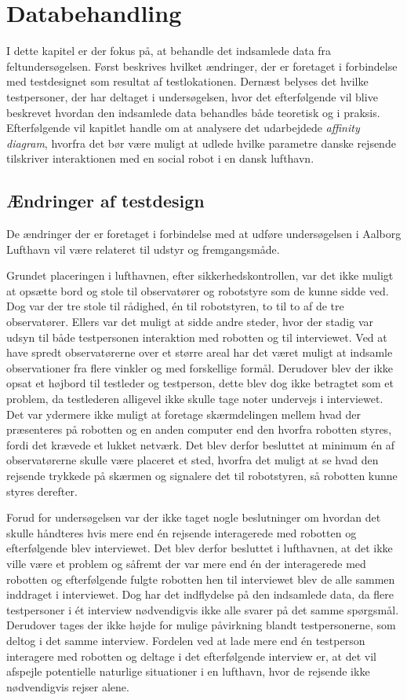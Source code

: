 \chapter{Databehandling}
\label{ParametreDatabehandling}
%
I dette kapitel er der fokus på, at behandle det indsamlede data fra feltundersøgelsen. Først beskrives hvilket ændringer, der er foretaget i forbindelse med testdesignet som resultat af testlokationen. Dernæst belyses det hvilke testpersoner, der har deltaget i undersøgelsen, hvor det efterfølgende vil blive beskrevet hvordan den indsamlede data behandles både teoretisk og i praksis. Efterfølgende vil kapitlet handle om at analysere det udarbejdede \textit{affinity diagram}, hvorfra det bør være muligt at udlede hvilke parametre danske rejsende tilskriver interaktionen med en social robot i en dansk lufthavn. 

\section{Ændringer af testdesign}
\label{ParametreTestdesign}
%
De ændringer der er foretaget i forbindelse med at udføre undersøgelsen i Aalborg Lufthavn vil være relateret til udstyr og fremgangsmåde. 

Grundet placeringen i lufthavnen, efter sikkerhedskontrollen, var det ikke muligt at opsætte bord og stole til observatører og robotstyre som de kunne sidde ved. Dog var der tre stole til rådighed, én til robotstyren, to til to af de tre observatører. Ellers var det muligt at sidde andre steder, hvor der stadig var udsyn til både testpersonen interaktion med robotten og til interviewet. Ved at have spredt observatørerne over et større areal har det været muligt at indsamle observationer fra flere vinkler og med forskellige formål. Derudover blev der ikke opsat et højbord til testleder og testperson, dette blev dog ikke betragtet som et problem, da testlederen alligevel ikke skulle tage noter undervejs i interviewet. Det var ydermere ikke muligt at foretage skærmdelingen mellem hvad der præsenteres på robotten og en anden computer end den hvorfra robotten styres, fordi det krævede et lukket netværk. Det blev derfor besluttet at minimum én af observatørerne skulle være placeret et sted, hvorfra det muligt at se hvad den rejsende trykkede på skærmen og signalere det til robotstyren, så robotten kunne styres derefter.

Forud for undersøgelsen var der ikke taget nogle beslutninger om hvordan det skulle håndteres hvis mere end én rejsende interagerede med robotten og efterfølgende blev interviewet. Det blev derfor besluttet i lufthavnen, at det ikke ville være et problem og såfremt der var mere end én der interagerede med robotten og efterfølgende fulgte robotten hen til interviewet blev de alle sammen inddraget i interviewet. Dog har det indflydelse på den indsamlede data, da flere testpersoner i ét interview nødvendigvis ikke alle svarer på det samme spørgsmål. Derudover tages der ikke højde for mulige påvirkning blandt testpersonerne, som deltog i det samme interview. Fordelen ved at lade mere end én testperson interagere med robotten og deltage i det efterfølgende interview er, at det vil afspejle potentielle naturlige situationer i en lufthavn, hvor de rejsende ikke nødvendigvis rejser alene.        

